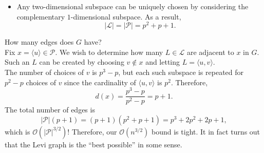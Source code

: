 \documentclass{article}
\begin{document}
\begin{enumerate}
\begin{itemize}
				\item Any two-dimensional subspace can be uniquely chosen by considering the complementary $1$-dimensional subspace. As a result,
				\[ |\mathcal{L}| = |\mathcal{P}| = p^2 + p + 1. \]
			\end{itemize}
			How many edges does $G$ have?\\
			Fix $x = \langle u \rangle \in \mathcal{P}$. We wish to determine how many $L\in\mathcal{L}$ are adjacent to $x$ in $G$. Such an $L$ can be created by choosing $v \not\in x$ and letting $L = \langle u,v\rangle$.\\The number of choices of $v$ is $p^3 - p$, but each such subspace is repeated for $p^2-p$ choices of $v$ since the cardinality of $\langle u,v\rangle$ is $p^2$. Therefore,
			\[ d(x) = \frac{p^3 - p}{p^2 - p} = p + 1. \]
			The total number of edges is
			\[ |\mathcal{P}| (p + 1) = (p+1)(p^2+p+1) = p^3 + 2p^2 + 2p + 1, \]
			which is $\mathcal{O}(|\mathcal{P}|^{3/2})$!
			Therefore, our $\mathcal{O}(n^{3/2})$ bound is tight. It in fact turns out that the Levi graph is the ``best possible'' in some sense.
		\end{enumerate}
\end{document}
